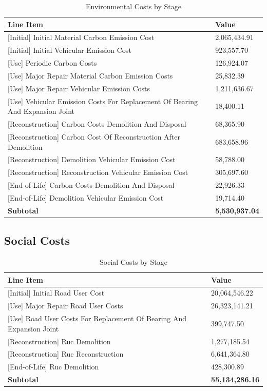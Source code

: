 \documentclass[12pt,a4paper]{article}
\begin{document}
\begin{table}[H]
\centering
\caption{Environmental Costs by Stage}
\begin{tabular}{L{9cm}R{5cm}}
\toprule
\textbf{Line Item} & \textbf{Value} \\
\midrule
  \mbox{[Initial]} Initial Material Carbon Emission Cost & 2,065,434.91 \\
  \mbox{[Initial]} Initial Vehicular Emission Cost & 923,557.70 \\
  \mbox{[Use]} Periodic Carbon Costs & 126,924.07 \\
  \mbox{[Use]} Major Repair Material Carbon Emission Costs & 25,832.39 \\
  \mbox{[Use]} Major Repair Vehicular Emission Costs & 1,211,636.67 \\
  \mbox{[Use]} Vehicular Emission Costs For Replacement Of Bearing And Expansion Joint & 18,400.11 \\
  \mbox{[Reconstruction]} Carbon Costs Demolition And Disposal & 68,365.90 \\
  \mbox{[Reconstruction]} Carbon Cost Of Reconstruction After Demolition & 683,658.96 \\
  \mbox{[Reconstruction]} Demolition Vehicular Emission Cost & 58,788.00 \\
  \mbox{[Reconstruction]} Reconstruction Vehicular Emission Cost & 305,697.60 \\
  \mbox{[End-of-Life]} Carbon Costs Demolition And Disposal & 22,926.33 \\
  \mbox{[End-of-Life]} Demolition Vehicular Emission Cost & 19,714.40 \\
\midrule
  \textbf{Subtotal} & \textbf{5,530,937.04} \\
\bottomrule
\end{tabular}
\end{table}


\subsection{Social Costs}

\begin{table}[H]
\centering
\caption{Social Costs by Stage}
\begin{tabular}{L{9cm}R{5cm}}
\toprule
\textbf{Line Item} & \textbf{Value} \\
\midrule
  \mbox{[Initial]} Initial Road User Cost & 20,064,546.22 \\
  \mbox{[Use]} Major Repair Road User Costs & 26,323,141.21 \\
  \mbox{[Use]} Road User Costs For Replacement Of Bearing And Expansion Joint & 399,747.50 \\
  \mbox{[Reconstruction]} Ruc Demolition & 1,277,185.54 \\
  \mbox{[Reconstruction]} Ruc Reconstruction & 6,641,364.80 \\
  \mbox{[End-of-Life]} Ruc Demolition & 428,300.89 \\
\midrule
  \textbf{Subtotal} & \textbf{55,134,286.16} \\
\bottomrule
\end{tabular}
\end{table}
\end{document}
